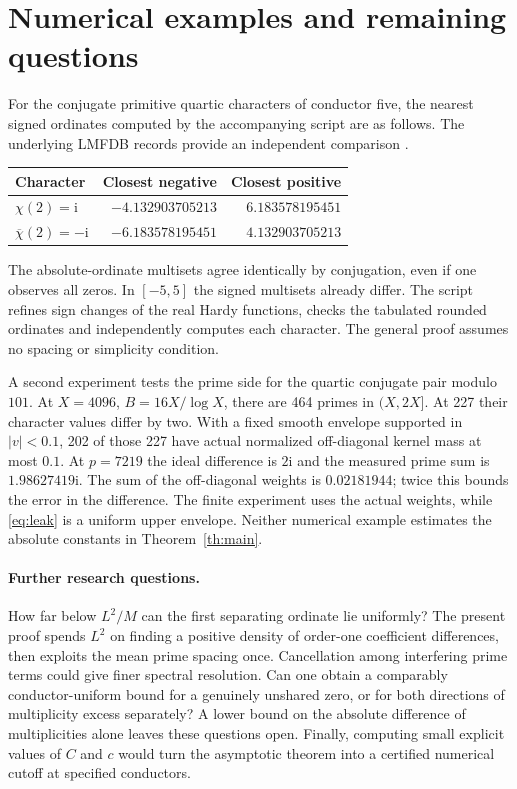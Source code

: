 \documentclass[11pt]{article}
\newcommand{\ii}{\mathrm i}
\begin{document}
\section{Numerical examples and remaining questions}
For the conjugate primitive quartic characters of conductor five, the nearest signed ordinates computed by the accompanying script are as follows. The underlying LMFDB records provide an independent comparison \cite{lmfdb}.
\begin{center}
\begin{tabular}{lrr}
\toprule
Character & Closest negative & Closest positive\\
\midrule
$\chi(2)=\ii$ & $-4.132903705213$ & $6.183578195451$\\
$\overline\chi(2)=-\ii$ & $-6.183578195451$ & $4.132903705213$\\
\bottomrule
\end{tabular}
\end{center}
The absolute-ordinate multisets agree identically by conjugation, even if one observes all zeros. In $[-5,5]$ the signed multisets already differ. The script refines sign changes of the real Hardy functions, checks the tabulated rounded ordinates and independently computes each character. The general proof assumes no spacing or simplicity condition.

A second experiment tests the prime side for the quartic conjugate pair modulo $101$. At $X=4096$, $B=16X/\log X$, there are 464 primes in $(X,2X]$. At 227 their character values differ by two. With a fixed smooth envelope supported in $|v|<0.1$, 202 of those 227 have actual normalized off-diagonal kernel mass at most $0.1$. At $p=7219$ the ideal difference is $2\ii$ and the measured prime sum is $1.98627419\ii$. The sum of the off-diagonal weights is $0.02181944$; twice this bounds the error in the difference. The finite experiment uses the actual weights, while \eqref{eq:leak} is a uniform upper envelope. Neither numerical example estimates the absolute constants in Theorem~\ref{th:main}.

\paragraph{Further research questions.}
How far below $L^2/M$ can the first separating ordinate lie uniformly? The present proof spends $L^2$ on finding a positive density of order-one coefficient differences, then exploits the mean prime spacing once. Cancellation among interfering prime terms could give finer spectral resolution. Can one obtain a comparably conductor-uniform bound for a genuinely unshared zero, or for both directions of multiplicity excess separately? A lower bound on the absolute difference of multiplicities alone leaves these questions open. Finally, computing small explicit values of $C$ and $c$ would turn the asymptotic theorem into a certified numerical cutoff at specified conductors.
\end{document}
